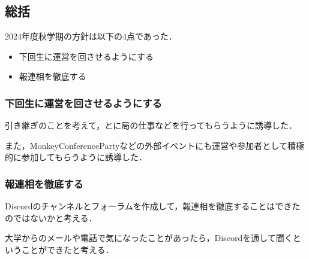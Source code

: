 \subsection*{\thirdGrade{}総括}


2024年度秋学期の\thirdGrade{}方針は以下の4点であった．

\begin{itemize}
    \item 下回生に運営を回させるようにする
    \item 報連相を徹底する
\end{itemize}

\subsubsection*{下回生に運営を回させるようにする}
引き継ぎのことを考えて，\firstGrade{}と\secondGrade{}に局の仕事などを行ってもらうように誘導した．

また，MonkeyConferencePartyなどの外部イベントにも運営や参加者として積極的に参加してもらうように誘導した．

\subsubsection*{報連相を徹底する}
Discordのチャンネルとフォーラムを作成して，報連相を徹底することはできたのではないかと考える．

大学からのメールや電話で気になったことがあったら，Discordを通して聞くということができたと考える．


